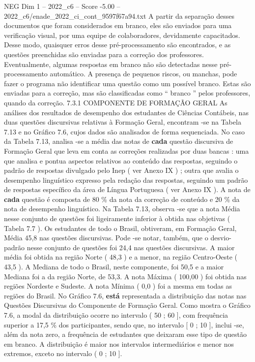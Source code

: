 \begin{textsample}{NEG Dim 1 – 2022\_c6 – Score -5.00 – 2022\_c6/enade\_2022\_ci\_cont\_9597f67a94.txt}
A partir da separação desses documentos que foram considerados em branco, eles são enviados para uma verificação visual, por uma equipe de colaboradores, devidamente capacitados.
Desse modo, quaisquer erros desse pré-processamento são encontrados, e as questões preenchidas são enviadas para a correção dos professores.
Eventualmente, algumas respostas em branco não são detectadas nesse pré-processamento automático.
A presença de pequenos riscos, ou manchas, pode fazer o programa não identificar uma questão como um possível branco.
Estas são enviadas para a correção, mas são classificadas como “ branco ” pelos professores, quando da correção. 7.3.1 COMPONENTE DE FORMAÇÃO GERAL As análises dos resultados de desempenho dos estudantes de Ciências Contábeis, nas duas questões discursivas relativas à Formação Geral, encontram -se na Tabela 7.13 e no Gráfico 7.6, cujos dados são analisados de forma sequenciada.
No caso da Tabela 7.13, analisa -se a média das notas de \textbf{cada} questão discursiva de Formação Geral que leva em conta as correções realizadas por duas bancas : uma que analisa e pontua aspectos relativos ao conteúdo das respostas, seguindo o padrão de respostas divulgado pelo Inep ( ver Anexo IX ) ; outra que avalia o desempenho linguístico expresso pela redação das respostas, seguindo um padrão de respostas específico da área de Língua Portuguesa ( ver Anexo IX ).
A nota de \textbf{cada} questão é composta de 80 \% da nota da correção de conteúdo e 20 \% da nota de desempenho linguístico.
Na Tabela 7.13, observa -se que a nota Média nesse conjunto de questões foi ligeiramente inferior à obtida nas objetivas ( Tabela 7.7 ).
Os estudantes de todo o Brasil, obtiveram, em Formação Geral, Média 45,8 nas questões discursivas.
Pode -se notar, também, que o desvio-padrão nesse conjunto de questões foi 24,4 nas questões discursivas.
A maior média foi obtida na região Norte ( 48,3 ) e a menor, na região Centro-Oeste ( 43,5 ).
A Mediana de todo o Brasil, neste componente, foi 50,5 e a maior Mediana foi a da região Norte, de 53,3.
A nota Máxima ( 100,00 ) foi obtida nas regiões Nordeste e Sudeste.
A nota Mínima ( 0,0 ) foi a mesma em todas as regiões do Brasil.
No Gráfico 7.6, \textbf{está} representada a distribuição das notas nas Questões Discursivas do Componente de Formação Geral.
Como mostra o Gráfico 7.6, a modal da distribuição ocorre no intervalo ( 50 ; 60 ], com frequência superior a 17,5 \% dos participantes, sendo que, no intervalo [ 0 ; 10 ], inclui -se, além da nota zero, a frequência de estudantes que deixaram esse tipo de questão em branco.
A distribuição é maior nos intervalos intermediários e menor nos extremos, exceto no intervalo ( 0 ; 10 ].

\end{textsample}
